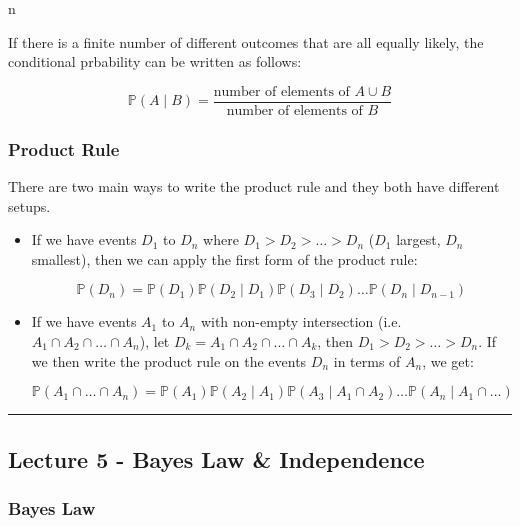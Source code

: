 n\documentclass{article}
\begin{document}
If there is a finite number of different outcomes that are all equally
likely, the conditional prbability can be written as follows:

\begin{equation}
  \boxed{
    \mathbb{P}(A \mid B) = \frac{\text{number of elements of } A \cup
      B}{\text{number of elements of } B}
  }
\end{equation}

\subsubsection{Product Rule}

There are two main ways to write the product rule and they both have
different setups.

\begin{itemize}
\item If we have events $D_1$ to $D_n$ where $D_1 > D_2 > \dots > D_n$
  ($D_1$ largest, $D_n$ smallest), then we can apply the first form of
  the product rule:

  \begin{equation}
    \tag{Product Rule 1}
    \boxed{
      \mathbb{P}(D_n) = \mathbb{P}(D_1) \mathbb{P}(D_2 \mid D_1)
      \mathbb{P}(D_3 \mid D_2) \dots \mathbb{P}(D_n \mid D_{n-1})
    }
  \end{equation}

\item If we have events $A_1$ to $A_n$ with non-empty intersection
  (i.e. $A_1 \cap A_2 \cap \dots \cap A_n$), let $D_k = A_1 \cap A_2
  \cap \dots \cap A_k$, then $D_1 > D_2 > \dots > D_n$. If we then
  write the product rule on the events $D_n$ in terms of $A_n$, we
  get:

  \begin{equation}
    \tag{Product Rule 2}
    \boxed{
      \mathbb{P}(A_1 \cap \dots \cap A_n) = \mathbb{P}(A_1)
      \mathbb{P}(A_2 \mid A_1) \mathbb{P}(A_3 \mid A_1 \cap A_2) \dots
      \mathbb{P}(A_n \mid A_1 \cap \dots)
    }
  \end{equation}
\end{itemize}


\medskip\hrule
\subsection{Lecture 5 - Bayes Law \& Independence}

\subsubsection{Bayes Law}
\end{document}
